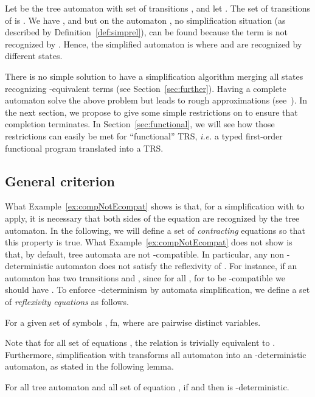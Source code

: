 \documentclass[a4paper,11pt]{llncs}
\theoremstyle{plain}
\begin{document}
\begin{example}
\label{ex:compNotEcompat}
  Let  be the tree automaton with set of transitions ,  and let . The set of transitions of  is . We have ,  and  but on the
  automaton , no simplification situation (as described by
  Definition~\ref{def:simprel}), can be found because the term  is not
  recognized by . Hence, the simplified automaton is
   where  and  are recognized by different states.
\end{example}

\noindent
There is no simple solution to have a simplification algorithm
merging all states recognizing -equivalent terms (see
Section~\ref{sec:further}). 
Having a complete automaton  solve the above problem but leads to rough
approximations (see~\cite{Genet-rep13}).
In the next section, we propose to give some simple restrictions on  to
ensure that completion terminates. In Section~\ref{sec:functional}, we will see 
how those restrictions can easily be met for ``functional'' TRS, {\em i.e.} a
typed first-order functional program translated into a TRS. 

\subsection{General criterion}
What Example~\ref{ex:compNotEcompat} shows is that, for a simplification with
 to apply, it is necessary that both sides of the equation are recognized by
the tree automaton. In the following, we will define a set  of {\em
  contracting} equations so that this property is true. What
Example~\ref{ex:compNotEcompat} does not show is that, by default, tree automata
are not -compatible. In particular, any non -deterministic automaton does not
satisfy the reflexivity of . For instance, if an automaton  has two
transitions  and , since  for all , for  to
be -compatible we should have .  To enforce
-determinism by automata simplification, we define a set of {\em reflexivity equations} as follows.

\begin{definition}
For a given set of symbols , fn, where  are pairwise
distinct variables.
\end{definition}

\noindent
Note that for all set of equations , the relation  is trivially equivalent to
. Furthermore, simplification with  transforms 
all automaton into an -deterministic automaton, as stated in the
following lemma.

\begin{lemma}
\label{lem:etf_det}
For all tree automaton  and all set of equation , if 
and  then  is -deterministic. 
\end{lemma}
\end{document}
